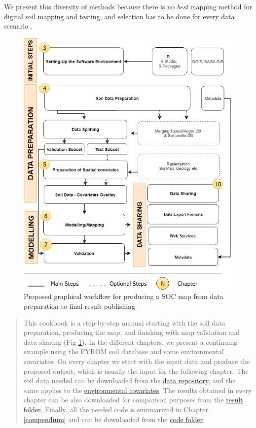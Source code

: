 \documentclass[10pt,b5paper,]{book}
\theoremstyle{definition}
\theoremstyle{definition}
\theoremstyle{definition}
\theoremstyle{remark}
\begin{document}
We present this diversity of methods because there is no \emph{best}
mapping method for digital soil mapping
 and testing, and selection has to be
done for every data scenario \citep{guevara_2018}.

\begin{figure}

{\centering \includegraphics[width=0.8\linewidth]{images/grworkflow} 

}

\caption{Proposed graphical workflow for producing a SOC map from data preparation to final result publishing}\label{fig:grworkflow}
\end{figure}

\begin{quote}
This cookbook is a step-by-step manual starting with the soil data
preparation, producing the map, and finishing with map validation and
data sharing (Fig \ref{fig:grworkflow}). In the different chapters, we
present a continuing example using the FYROM soil database and some
environmental covariates. On every chapter we start with the input data
and produce the proposed output, which is usually the input for the
following chapter. The soil data needed can be downloaded from the
\href{https://github.com/FAO-GSP/SOC-Mapping-Cookbook/tree/master/data}{data
repository}, and the same applies to the
\href{https://github.com/FAO-GSP/SOC-Mapping-Cookbook/tree/master/covs}{environmental
covariates}. The results obtained in every chapter can be also
downloaded for comparison purposes from the
\href{https://github.com/FAO-GSP/SOC-Mapping-Cookbook/tree/master/results}{result
folder}. Finally, all the needed code is summarized in Chapter
\ref{compendium} and can be downloaded from the
\href{https://github.com/FAO-GSP/SOC-Mapping-Cookbook/tree/master/code}{code
folder}.
\end{quote}
\end{document}
